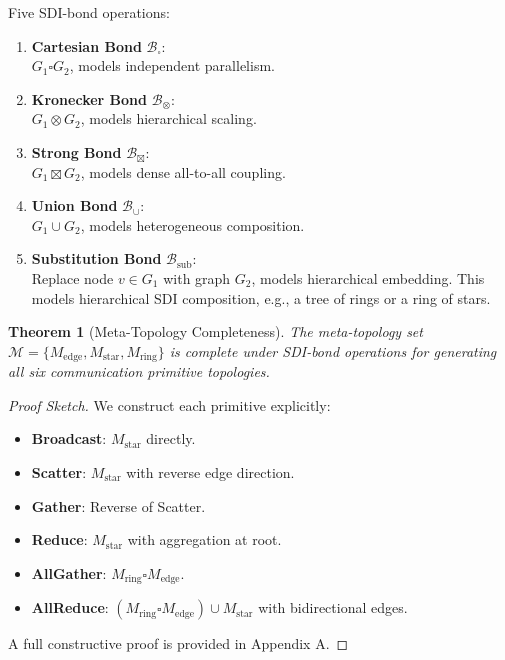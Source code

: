 \documentclass[12pt]{article}
\newtheorem{theorem}{Theorem}[section]
\begin{document}
Five SDI-bond operations:
\begin{enumerate}
\item \textbf{Cartesian Bond} $\mathcal{B}_{\square}$: \\
$G_1 \square G_2$, models independent parallelism.
\item \textbf{Kronecker Bond} $\mathcal{B}_{\otimes}$: \\
$G_1 \otimes G_2$, models hierarchical scaling.
\item \textbf{Strong Bond} $\mathcal{B}_{\boxtimes}$: \\
$G_1 \boxtimes G_2$, models dense all-to-all coupling.
\item \textbf{Union Bond} $\mathcal{B}_{\cup}$: \\
$G_1 \cup G_2$, models heterogeneous composition.
\item \textbf{Substitution Bond} $\mathcal{B}_{\text{sub}}$: \\
Replace node $v \in G_1$ with graph $G_2$, models hierarchical
embedding. This models hierarchical SDI composition, e.g., a tree
of rings or a ring of stars.
\end{enumerate}

\begin{theorem}[Meta-Topology Completeness]
\label{thm:completeness}
The meta-topology set $\mathcal{M} = \{M_{\text{edge}}, M_{\text{star}},
M_{\text{ring}}\}$ is complete under SDI-bond operations for
generating all six communication primitive topologies.
\end{theorem}

\begin{proof}[Proof Sketch]
We construct each primitive explicitly:
\begin{itemize}
\item \textbf{Broadcast}: $M_{\text{star}}$ directly.
\item \textbf{Scatter}: $M_{\text{star}}$ with reverse edge direction.
\item \textbf{Gather}: Reverse of Scatter.
\item \textbf{Reduce}: $M_{\text{star}}$ with aggregation at root.
\item \textbf{AllGather}: $M_{\text{ring}} \square M_{\text{edge}}$.
\item \textbf{AllReduce}: $(M_{\text{ring}} \square M_{\text{edge}})
\cup M_{\text{star}}$ with bidirectional edges.
\end{itemize}
A full constructive proof is provided in Appendix A.
\end{proof}
\end{document}
